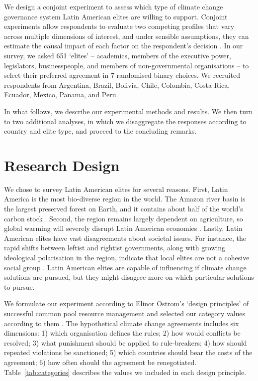 \documentclass[a4paper,12pt]{article}
\begin{document}

We design a conjoint experiment to assess which type of climate change governance system Latin American elites are willing to support. Conjoint experiments allow respondents to evaluate two competing profiles that vary across multiple dimensions of interest, and under sensible assumptions, they can estimate the causal impact of each factor on the respondent's decision \citep{bansak2016economic, hainmueller2014causal}. In our survey, we asked 651 `elites' -- academics, members of the executive power, legislators, businesspeople, and members of non-governmental organisations -- to select their preferred agreement in 7 randomised binary choices. We recruited respondents from Argentina, Brazil, Bolivia, Chile, Colombia, Costa Rica, Ecuador, Mexico, Panama, and Peru.

In what follows, we describe our experimental methods and results. We then turn to two additional analyses, in which we disaggregate the responses according to country and elite type, and proceed to the concluding remarks.

\section{Research Design}%
\label{sec:research_design}

We chose to survey Latin American elites for several reasons. First, Latin America is the most bio-diverse region in the world. The Amazon river basin is the largest preserved forest on Earth, and it contains about half of the world's carbon stock \citep{yang2018post}. Second, the region remains largely dependent on agriculture, so global warming will severely disrupt Latin American economies \citep{jones2003potential}. Lastly, Latin American elites have vast disagreements about societal issues. For instance, the rapid shifts between leftist and rightist governments, along with growing ideological polarisation in the region, indicate that local elites are not a cohesive social group  \citep{ellner2019pinktide}. Latin American elites are capable of influencing if climate change solutions are pursued, but they might disagree more on which particular solutions to pursue.

We formulate our experiment according to Elinor Ostrom's `design principles' of successful common pool resource management and selected our category values according to them \citep{ostrom1990governing, bechtel2013mass}. The hypothetical climate change agreements includes six dimensions: 1) which organisation defines the rules; 2) how would conflicts be resolved; 3) what punishment should be applied to rule-breakers; 4) how should repeated violations be sanctioned; 5) which countries should bear the costs of the agreement; 6) how often should the agreement be renegotiated. Table~\ref{tab:categories} describes the values we included in each design principle. \\
\end{document}
